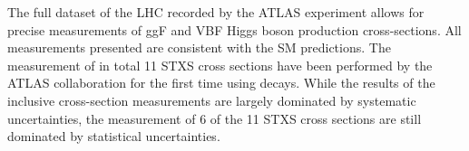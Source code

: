 The full \RunTwo dataset of the LHC recorded by the ATLAS experiment allows for precise measurements of ggF and VBF Higgs boson production cross-sections.
All measurements presented are consistent with the SM predictions. 
The measurement of in total 11 STXS cross sections have been performed by the ATLAS collaboration for the first time using \HWW decays. 
While the results of the inclusive cross-section measurements are largely dominated by systematic uncertainties, the measurement of 6 of the 11 STXS cross sections are still dominated by statistical uncertainties. 

